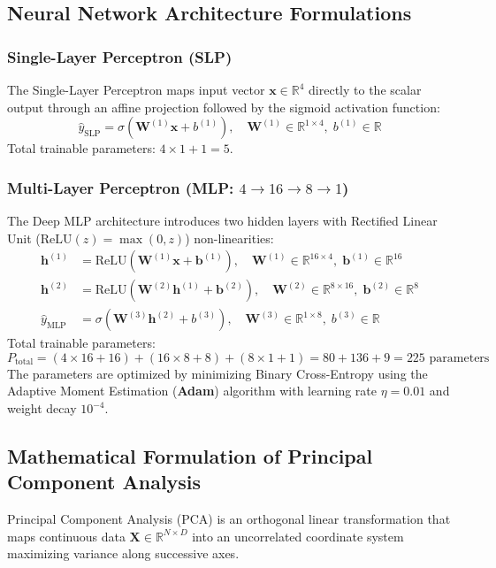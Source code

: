 \documentclass[12pt,a4paper]{article}
\begin{document}
\subsection{Neural Network Architecture Formulations}

\subsubsection{Single-Layer Perceptron (SLP)}
The Single-Layer Perceptron maps input vector $\mathbf{x} \in \mathbb{R}^4$ directly to the scalar output through an affine projection followed by the sigmoid activation function:
\begin{equation}
\hat{y}_{\text{SLP}} = \sigma(\mathbf{W}^{(1)} \mathbf{x} + b^{(1)}), \quad \mathbf{W}^{(1)} \in \mathbb{R}^{1 \times 4}, \; b^{(1)} \in \mathbb{R}
\end{equation}
Total trainable parameters: $4 \times 1 + 1 = 5$.

\subsubsection{Multi-Layer Perceptron (MLP: $4 \to 16 \to 8 \to 1$)}
The Deep MLP architecture introduces two hidden layers with Rectified Linear Unit ($\text{ReLU}(z) = \max(0, z)$) non-linearities:
\begin{align}
\mathbf{h}^{(1)} &= \text{ReLU}(\mathbf{W}^{(1)} \mathbf{x} + \mathbf{b}^{(1)}), \quad \mathbf{W}^{(1)} \in \mathbb{R}^{16 \times 4}, \; \mathbf{b}^{(1)} \in \mathbb{R}^{16} \\
\mathbf{h}^{(2)} &= \text{ReLU}(\mathbf{W}^{(2)} \mathbf{h}^{(1)} + \mathbf{b}^{(2)}), \quad \mathbf{W}^{(2)} \in \mathbb{R}^{8 \times 16}, \; \mathbf{b}^{(2)} \in \mathbb{R}^{8} \\
\hat{y}_{\text{MLP}} &= \sigma(\mathbf{W}^{(3)} \mathbf{h}^{(2)} + b^{(3)}), \quad \mathbf{W}^{(3)} \in \mathbb{R}^{1 \times 8}, \; b^{(3)} \in \mathbb{R}
\end{align}
Total trainable parameters:
\begin{equation}
P_{\text{total}} = (4 \times 16 + 16) + (16 \times 8 + 8) + (8 \times 1 + 1) = 80 + 136 + 9 = 225 \text{ parameters}
\end{equation}
The parameters are optimized by minimizing Binary Cross-Entropy using the Adaptive Moment Estimation (\textbf{Adam}) algorithm with learning rate $\eta = 0.01$ and weight decay $10^{-4}$.

\subsection{Mathematical Formulation of Principal Component Analysis}
Principal Component Analysis (PCA) is an orthogonal linear transformation that maps continuous data $\mathbf{X} \in \mathbb{R}^{N \times D}$ into an uncorrelated coordinate system maximizing variance along successive axes.
\end{document}

